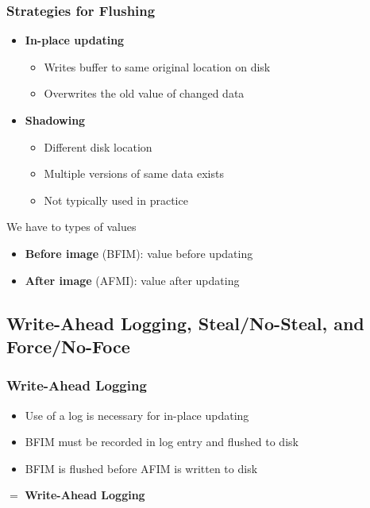 \subsubsection{Strategies for Flushing}
\begin{itemize}
	\item \textbf{In-place updating}
	\begin{itemize}
		\item Writes buffer to same original location on disk
		\item Overwrites the old value of changed data
	\end{itemize}
	\item \textbf{Shadowing}
	\begin{itemize}
		\item Different disk location
		\item Multiple versions of same data exists
		\item Not typically used in practice
	\end{itemize}
\end{itemize}
We have to types of values
\begin{itemize}
	\item \textbf{Before image} (BFIM): value before updating
	\item \textbf{After image} (AFMI): value after updating
\end{itemize}
\subsection{Write-Ahead Logging, Steal/No-Steal, and Force/No-Foce}
\subsubsection{Write-Ahead Logging}
\begin{itemize}
	\item Use of a log is necessary for in-place updating
	\item BFIM must be recorded in log entry and flushed to disk
	\item BFIM is flushed before AFIM is written to disk
\end{itemize}
$=$ \textbf{Write-Ahead Logging}
